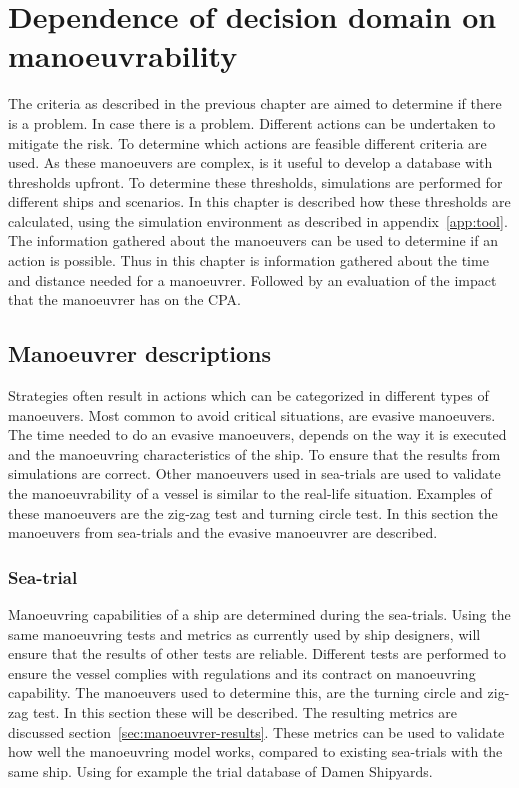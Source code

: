 \chapter{Dependence of decision domain on manoeuvrability}
\label{ch:criteria-manouvre}
The criteria as described in the previous chapter are aimed to determine if there is a problem. In case there is a problem. Different actions can be undertaken to mitigate the risk. To determine which actions are feasible different criteria are used. As these manoeuvers are complex, is it useful to develop a database with thresholds upfront. To determine these thresholds, simulations are performed for different ships and scenarios. In this chapter is described how these thresholds are calculated, using the simulation environment as described in appendix~\ref{app:tool}. The information gathered about the manoeuvers can be used to determine if an action is possible. Thus in this chapter is information gathered about the time and distance needed for a manoeuvrer. Followed by an evaluation of the impact that the manoeuvrer has on the CPA.

\section{Manoeuvrer descriptions}
\label{sec:manoeuvrer-description}
Strategies often result in actions which can be categorized in different types of manoeuvers. Most common to avoid critical situations, are evasive manoeuvers. The time needed to do an evasive manoeuvers, depends on the way it is executed and the manoeuvring characteristics of the ship. To ensure that the results from simulations are correct. Other manoeuvers used in sea-trials are used to validate the manoeuvrability of a vessel is similar to the real-life situation. Examples of these manoeuvers are the zig-zag test and turning circle test. In this section the manoeuvers from sea-trials and the evasive manoeuvrer are described.

\subsection{Sea-trial}
Manoeuvring capabilities of a ship are determined during the sea-trials. Using the same manoeuvring tests and metrics as currently used by ship designers, will ensure that the results of other tests are reliable. Different tests are performed to ensure the vessel complies with regulations and its contract on manoeuvring capability. The manoeuvers used to determine this, are the turning circle and zig-zag test. In this section these will be described. The resulting metrics are discussed section~\ref{sec:manoeuvrer-results}. These metrics can be used to validate how well the manoeuvring model works, compared to existing sea-trials with the same ship. Using for example the trial database of Damen Shipyards.

